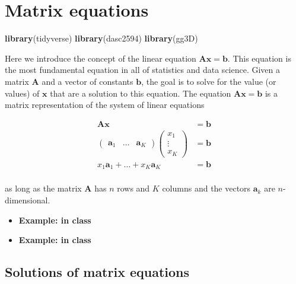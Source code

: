 \documentclass[
]{book}
\newenvironment{Shaded}{\begin{snugshade}}{\end{snugshade}}
\newcommand{\KeywordTok}[1]{\textcolor[rgb]{0.13,0.29,0.53}{\textbf{#1}}}
\newcommand{\NormalTok}[1]{#1}
\theoremstyle{definition}
\theoremstyle{definition}
\theoremstyle{definition}
\theoremstyle{definition}
\theoremstyle{remark}
\begin{document}
\hypertarget{matrix-equation}{%
\chapter{Matrix equations}\label{matrix-equation}}

\begin{Shaded}
\begin{Highlighting}[]
\KeywordTok{library}\NormalTok{(tidyverse)}
\KeywordTok{library}\NormalTok{(dasc2594)}
\KeywordTok{library}\NormalTok{(gg3D)}
\end{Highlighting}
\end{Shaded}

Here we introduce the concept of the linear equation \(\mathbf{A} \mathbf{x} = \mathbf{b}\). This equation is the most fundamental equation in all of statistics and data science. Given a matrix \(\mathbf{A}\) and a vector of constants \(\mathbf{b}\), the goal is to solve for the value (or values) of \(\mathbf{x}\) that are a solution to this equation. The equation \(\mathbf{A} \mathbf{x} = \mathbf{b}\) is a matrix representation of the system of linear equations

\[
\begin{aligned}
\mathbf{A} \mathbf{x} & = \mathbf{b} \\
\begin{pmatrix} \mathbf{a}_1 & \ldots & \mathbf{a}_K \end{pmatrix} \begin{pmatrix} x_1 \\ \vdots \\ x_K \end{pmatrix} & = \mathbf{b} \\
x_1 \mathbf{a}_1 + \ldots + x_K \mathbf{a}_K & = \mathbf{b} \\
\end{aligned}
\label{eq:matrix-equation}
\]

as long as the matrix \(\mathbf{A}\) has \(n\) rows and \(K\) columns and the vectors \(\mathbf{a}_k\) are \(n\)-dimensional.

\begin{itemize}
\item
  \textbf{Example: in class}
\item
  \textbf{Example: in class}
\end{itemize}

\hypertarget{solutions-of-matrix-equations}{%
\section{Solutions of matrix equations}\label{solutions-of-matrix-equations}}
\end{document}
